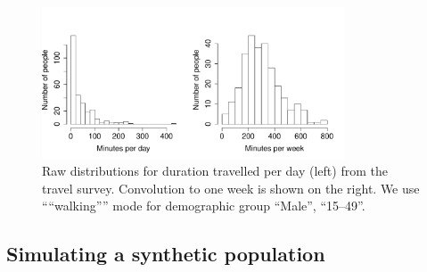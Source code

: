 \documentclass{article}
\begin{document}
\begin{appendix}
\begin{figure}[H]
\centering
\includegraphics[width=0.8\textwidth]{raw_densities.pdf}
\caption{\small Raw distributions for duration travelled per day (left) from the travel survey. Convolution to one week is shown on the right. We use ````walking'''' mode for demographic group ``Male'', ``15--49''.}
\label{raw_densities}
\end{figure}


\subsection{Simulating a synthetic population}\label{synthpop}


\end{appendix}
\end{document}
